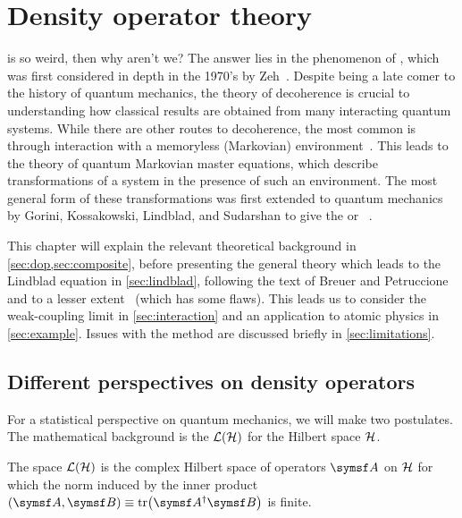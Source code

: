 \documentclass[../thesis.tex]{subfiles}
\begin{document}
\chapter{Density operator theory}

 is so weird, then why aren't we? The answer lies in the
phenomenon of , which was first considered in depth in the
1970's by Zeh~\cite{zeh}. Despite being a late comer to the history of quantum
mechanics, the theory of decoherence is crucial to understanding how classical
results are obtained from many interacting quantum systems. While there are
other routes to decoherence, the most common is through interaction with a
memoryless (Markovian) environment~\cite{decoherence}. This leads to the theory
of quantum Markovian master equations, which describe transformations of a
system in the presence of such an environment. The most general form of these
transformations was first extended to quantum mechanics by Gorini, Kossakowski,
Lindblad, and Sudarshan to give the \textsc{} or ~\cite{gks,lindblad}.

This chapter will explain the relevant theoretical background in
\cref{sec:dop,sec:composite}, before presenting the general theory which leads
to the Lindblad equation in \cref{sec:lindblad}, following the text of Breuer
and Petruccione~\cite{opensys} and to a lesser extent~\cite{intro} (which has
some flaws). This leads us to consider the weak-coupling limit in
\cref{sec:interaction} and an application to atomic physics in
\cref{sec:example}. Issues with the method are discussed briefly in
\cref{sec:limitations}.

\section{Different perspectives on density operators\label{sec:dop}}

For a statistical perspective on quantum mechanics, we will make two postulates.
The mathematical background is the  $\mathcal{L}(\mathcal{H})$ for the
Hilbert space $\mathcal{H}$.
\begin{defn}
  The space $\mathcal{L}(\mathcal{H})$ is the complex Hilbert space of operators $\opr{A}$
  on $\mathcal{H}$ for which the norm induced by the inner product
  $\lprod{\opr{A}}{\opr{B}} \defeq \tr(\opr{A}^\dag \opr{B})$ is finite.
\end{defn}
\end{document}
